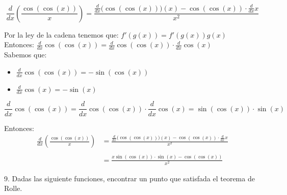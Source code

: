 \documentclass[12pt]{article}
\begin{document}
\begin{enumerate}[\hspace{9px} a)]
        \begin{equation*}
            \displaystyle\frac{d}{dx}\left(\frac{\cos(\cos(x))}{x}\right)=\frac{\displaystyle\frac{d}{dx}\big(\cos(\cos(x))\big)(x)-\cos(\cos(x))\cdot\frac{d}{dx}x}{x^2}
        \end{equation*}

        Por la ley de la cadena tenemos que: \(f'(g(x))=f'(g(x))g(x)\)\\

        Entonces: \quad \(\displaystyle\frac{d}{dx}\cos(\cos(x))=\frac{d}{dx}\cos(\cos(x))\cdot\frac{d}{dx}\cos(x)\)\\

        Sabemos que:
        \begin{itemize}
            \item \(\displaystyle\frac{d}{dx}\cos(\cos(x))=-\sin(\cos(x))\)
            \item \(\displaystyle\frac{d}{dx}\cos(x)=-\sin(x)\)
        \end{itemize}

        \begin{equation*}
            \displaystyle\frac{d}{dx}\cos(\cos(x))=\frac{d}{dx}\cos(\cos(x))\cdot\frac{d}{dx}\cos(x)=\sin(\cos(x))\cdot\sin(x)
        \end{equation*}

        Entonces:
        \begin{align*}
            \displaystyle\frac{d}{dx}\left(\frac{\cos(\cos(x))}{x}\right)&=\frac{\displaystyle\frac{d}{dx}\big(\cos(\cos(x))\big)(x)-\cos(\cos(x))\cdot\frac{d}{dx}x}{x^2}\\ \\
            &=\frac{x\sin(\cos(x))\cdot\sin(x)-\cos(\cos(x))}{x^2}
        \end{align*}

\end{enumerate}

9. Dadas las siguiente funciones, encontrar un punto que satisfada el teorema de Rolle.
\end{document}
